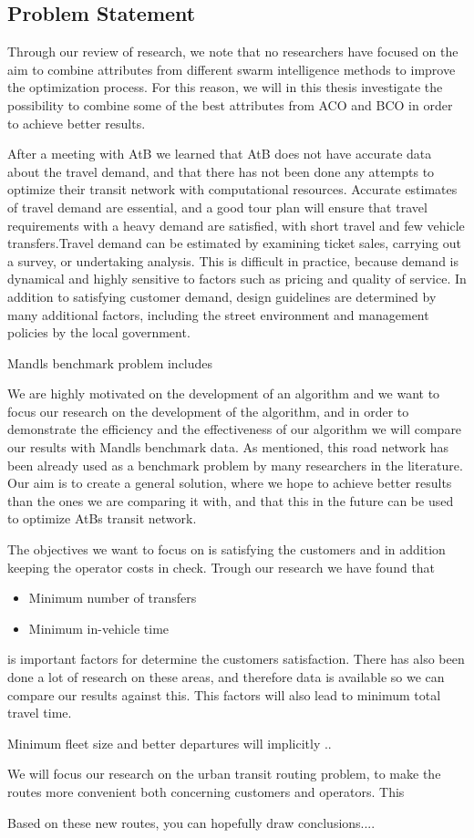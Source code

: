 \subsection{Problem Statement}
Through our review of research, we note that no researchers have focused on the aim to combine attributes from different swarm intelligence methods to improve the optimization process. For this reason, we will in this thesis investigate the possibility to combine some of the best attributes from ACO and BCO in order to achieve better results.

After a meeting with AtB we learned that AtB does not have accurate data about the travel demand, and that there has not been done any attempts to optimize their transit network with computational resources. Accurate estimates of travel demand are essential, and a good tour plan will ensure that travel requirements with a heavy demand are satisfied, with short travel and few vehicle transfers.Travel demand can be estimated by examining ticket sales, carrying out a survey, or undertaking analysis. This is difficult in practice, because demand is dynamical and highly sensitive to factors such as pricing and quality of service. In addition to satisfying customer demand, design guidelines are determined by many additional factors, including the street environment and management policies by the local government.

Mandls benchmark problem includes 

We are highly motivated on the development of an algorithm and we want to focus our research on the development of the algorithm, and in order to demonstrate the efficiency and the effectiveness of our algorithm we will compare our results with Mandls benchmark data. As mentioned, this road network has been already used as a benchmark problem by many researchers in the literature. Our aim is to create a general solution, where we hope to achieve better results than the ones we are comparing it with, and that this in the future can be used to optimize AtBs transit network. 


The objectives we want to focus on is satisfying the customers and in addition keeping the operator costs in check. Trough our research we have found that 
\begin{itemize}
\item Minimum number of transfers
\item Minimum in-vehicle time
\end{itemize}
is important factors for determine the customers satisfaction. There has also been done a lot of research on these areas, and therefore data is available so we can compare our results against this. This factors will also lead to minimum total travel time. 

Minimum fleet size and better departures will implicitly ..

We will focus our research on the urban transit routing problem, to make the routes more convenient both concerning customers and operators. This

Based on these new routes, you can hopefully draw conclusions....
